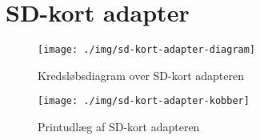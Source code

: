 \chapter{SD-kort adapter}
\label{ch:b-sd}

\begin{figure}[htbp]
  \centering
  \texttt{[image: ./img/sd-kort-adapter-diagram]}
  \caption{Kredsløbsdiagram over SD-kort adapteren}
  \label{fig:label-her}
\end{figure}


\begin{figure}[htbp]
  \centering
  \texttt{[image: ./img/sd-kort-adapter-kobber]}
  \caption{Printudlæg af SD-kort adapteren}
  \label{fig:label-her}
\end{figure}
